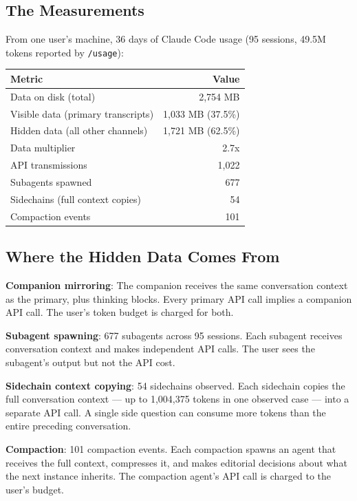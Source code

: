 \documentclass[11pt,a4paper]{article}
\begin{document}
\subsection{The Measurements}

From one user's machine, 36 days of Claude Code usage (95 sessions, 49.5M tokens reported by \texttt{/usage}):

\begin{center}
\begin{tabular}{lr}
\toprule
\textbf{Metric} & \textbf{Value} \\
\midrule
Data on disk (total) & 2,754 MB \\
Visible data (primary transcripts) & 1,033 MB (37.5\%) \\
Hidden data (all other channels) & 1,721 MB (62.5\%) \\
Data multiplier & 2.7x \\
API transmissions & 1,022 \\
Subagents spawned & 677 \\
Sidechains (full context copies) & 54 \\
Compaction events & 101 \\
\bottomrule
\end{tabular}
\end{center}

\subsection{Where the Hidden Data Comes From}

\textbf{Companion mirroring}: The companion receives the same conversation context as the primary, plus thinking blocks. Every primary API call implies a companion API call. The user's token budget is charged for both.

\textbf{Subagent spawning}: 677 subagents across 95 sessions. Each subagent receives conversation context and makes independent API calls. The user sees the subagent's output but not the API cost.

\textbf{Sidechain context copying}: 54 sidechains observed. Each sidechain copies the full conversation context --- up to 1,004,375 tokens in one observed case --- into a separate API call. A single side question can consume more tokens than the entire preceding conversation.

\textbf{Compaction}: 101 compaction events. Each compaction spawns an agent that receives the full context, compresses it, and makes editorial decisions about what the next instance inherits. The compaction agent's API call is charged to the user's budget.
\end{document}
